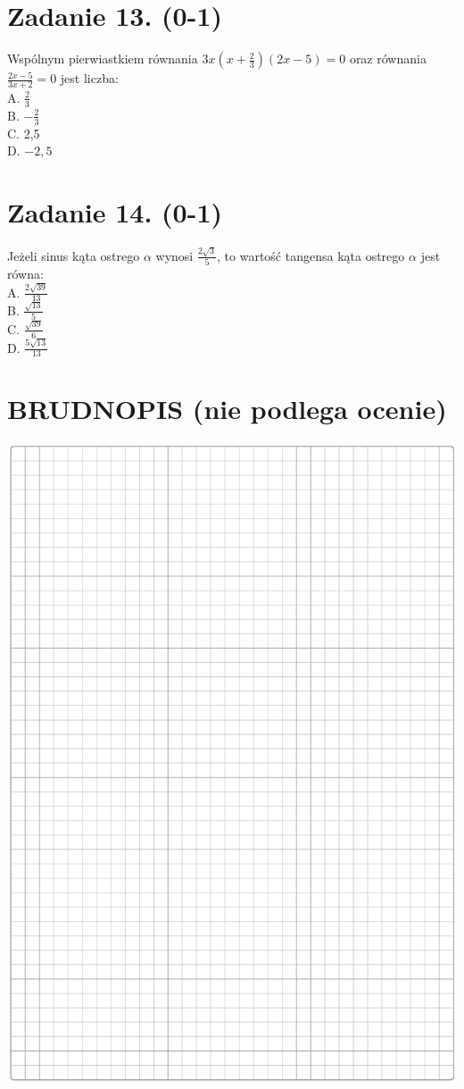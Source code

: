 \documentclass[10pt]{article}
\begin{document}
\section*{Zadanie 13. (0-1)}
Wspólnym pierwiastkiem równania \(3 x\left(x+\frac{2}{3}\right)(2 x-5)=0\) oraz równania \(\frac{2 x-5}{3 x+2}=0\) jest liczba:\\
A. \(\frac{2}{3}\)\\
B. \(-\frac{2}{3}\)\\
C. 2,5\\
D. \(-2,5\)

\section*{Zadanie 14. (0-1)}
Jeżeli sinus kąta ostrego \(\alpha\) wynosi \(\frac{2 \sqrt{3}}{5}\), to wartość tangensa kąta ostrego \(\alpha\) jest równa:\\
A. \(\frac{2 \sqrt{39}}{13}\)\\
B. \(\frac{\sqrt{13}}{5}\)\\
C. \(\frac{\sqrt{39}}{6}\)\\
D. \(\frac{5 \sqrt{13}}{13}\)

\section*{BRUDNOPIS (nie podlega ocenie)}
\begin{center}
\includegraphics[max width=\textwidth]{2024_11_21_6574e892c2387ce90f12g-05}
\end{center}
\end{document}
